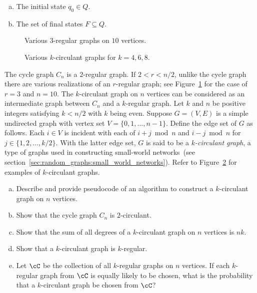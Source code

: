 \begin{problem}
\begin{enumerate}[(a)]
  \item The initial state $q_0 \in Q$.

  \item The set of final states $F \subseteq Q$.
  \end{enumerate}

\begin{figure}[!htbp]
\centering
{}

\caption{Various $3$-regular graphs on $10$ vertices.}
\label{fig:introduction:3_regular_graphs_10_vertices}
\end{figure}

\begin{figure}[!htbp]
\centering
{}

\caption{Various $k$-circulant graphs for $k = 4, 6, 8$.}
\label{fig:introduction:k_circulant_graphs}
\end{figure}

\item The cycle graph $C_n$ is a $2$-regular
  graph. If $2 < r < n/2$, unlike the cycle graph there are various
  realizations of an $r$-regular graph; see
  Figure~\ref{fig:introduction:3_regular_graphs_10_vertices} for the
  case of $r = 3$ and $n = 10$. The
  $k$-circulant graph on $n$
  vertices can be considered as an intermediate graph between $C_n$
  and a $k$-regular graph. Let $k$ and $n$ be positive integers
  satisfying $k < n / 2$ with $k$ being even. Suppose $G = (V,E)$ is a
  simple undirected graph with vertex set
  $V = \{0, 1, \dots, n - 1\}$. Define the edge set of $G$ as
  follows. Each $i \in V$ is incident with each of $i + j \bmod n$ and
  $i - j \bmod n$ for $j \in \{1, 2, \dots, k/2\}$. With the latter
  edge set, $G$ is said to be a \emph{$k$-circulant graph}, a type of
  graphs used in constructing small-world
  networks~(see
  section~\ref{sec:random_graphs:small_world_networks}). Refer to
  Figure~\ref{fig:introduction:k_circulant_graphs} for examples of
  $k$-circulant graphs.
  \begin{enumerate}[(a)]
  \item Describe and provide pseudocode of an algorithm to construct a
    $k$-circulant graph on $n$ vertices.

  \item Show that the cycle graph $C_n$ is $2$-circulant.

  \item Show that the sum of all degrees of a $k$-circulant graph on
    $n$ vertices is $nk$.

  \item Show that a $k$-circulant graph is $k$-regular.

  \item Let $\cC$ be the collection of all $k$-regular graphs on $n$
    vertices. If each $k$-regular graph from $\cC$ is equally likely
    to be chosen, what is the probability that a $k$-circulant graph
    be chosen from $\cC$?
  \end{enumerate}
\end{problem}

